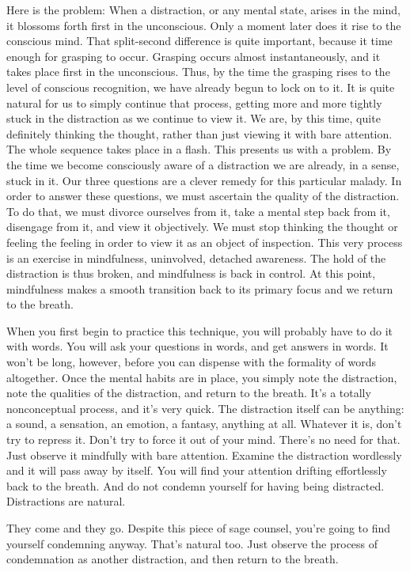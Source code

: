 Here is the problem: When a distraction, or any mental state, arises in the
mind, it blossoms forth first in the unconscious. Only a moment later does it
rise to the conscious mind. That split-second difference is quite important,
because it time enough for grasping to occur. Grasping occurs almost
instantaneously, and it takes place first in the unconscious. Thus, by the time
the grasping rises to the level of conscious recognition, we have already begun
to lock on to it. It is quite natural for us to simply continue that process,
getting more and more tightly stuck in the distraction as we continue to view
it. We are, by this time, quite definitely thinking the thought, rather than
just viewing it with bare attention. The whole sequence takes place in a flash.
This presents us with a problem. By the time we become consciously aware of a
distraction we are already, in a sense, stuck in it. Our three questions are a
clever remedy for this particular malady. In order to answer these questions, we
must ascertain the quality of the distraction. To do that, we must divorce
ourselves from it, take a mental step back from it, disengage from it, and view
it objectively. We must stop thinking the thought or feeling the feeling in
order to view it as an object of inspection. This very process is an exercise in
mindfulness, uninvolved, detached awareness. The hold of the distraction is thus
broken, and mindfulness is back in control. At this point, mindfulness makes a
smooth transition back to its primary focus and we return to the breath.

When you first begin to practice this technique, you will probably have to do it
with words. You will ask your questions in words, and get answers in words. It
won't be long, however, before you can dispense with the formality of words
altogether. Once the mental habits are in place, you simply note the
distraction, note the qualities of the distraction, and return to the breath.
It's a totally nonconceptual process, and it's very quick. The distraction
itself can be anything: a sound, a sensation, an emotion, a fantasy, anything at
all. Whatever it is, don't try to repress it. Don't try to force it out of your
mind. There's no need for that. Just observe it mindfully with bare attention.
Examine the distraction wordlessly and it will pass away by itself. You will
find your attention drifting effortlessly back to the breath. And do not condemn
yourself for having being distracted. Distractions are natural.

They come and they go.
Despite this piece of sage counsel, you're going to find yourself condemning anyway. That's natural too. Just observe the process
of condemnation as another distraction, and then return to the breath.

